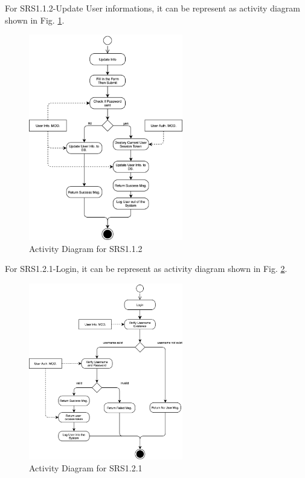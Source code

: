 For SRS1.1.2-Update User informations, it can be represent as activity diagram shown in Fig. \ref{fig:srs_diagram_2}.

\begin{figure}[t]
	\centering
	\includegraphics[width=0.6\textwidth]{./img/srs_diagram_2.png}
	\caption{Activity Diagram for SRS1.1.2}
	\label{fig:srs_diagram_2}
\end{figure}

For SRS1.2.1-Login, it can be represent as activity diagram shown in Fig. \ref{fig:srs_diagram_3}.

\begin{figure}[t]
	\centering
	\includegraphics[width=0.6\textwidth]{./img/srs_diagram_3.png}
	\caption{Activity Diagram for SRS1.2.1}
	
	\label{fig:srs_diagram_3}
\end{figure}


